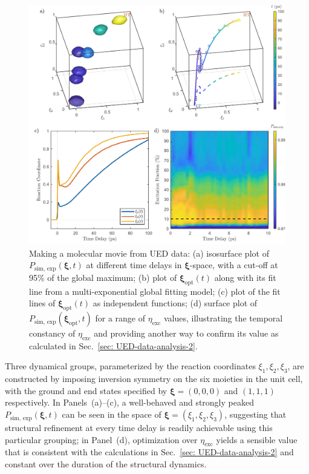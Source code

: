 \begin{figure}[t!]
  \centering
  \includegraphics[width = \textwidth]{Figures/fig_UED_molecularmovie_.pdf}
  \caption[Making a molecular movie from UED data.]{
    Making a molecular movie from UED data:
    (a) isosurface plot of $P_\text{sim, exp}(\boldsymbol{\xi}, t)$ at different time delays
    in $\boldsymbol{\xi}$-space, with a cut-off at 95\% of the global maximum;
    (b) plot of $\boldsymbol{\xi}_\text{opt}(t)$ along with its fit line
    from a multi-exponential global fitting model;
    (c) plot of the fit lines of $\boldsymbol{\xi}_\text{opt}(t)$ as independent functions;
    (d) surface plot of $P_\text{sim, exp}(\boldsymbol{\xi}_\text{opt}, t)$ for a range of $\eta_\text{exc}$
    values, illustrating the temporal constancy of $\eta_\text{exc}$ and providing another way to confirm
    its value as calculated in Sec.~\ref{sec: UED-data-analysis-2}.
  }
  \label{fig: UED-molecularmovie}
\end{figure}

Three dynamical groups, parameterized by the reaction coordinates $\xi_1, \xi_2, \xi_3$, are constructed
by imposing inversion symmetry on the six moieties in the unit cell,
with the ground and end states specified by $\boldsymbol{\xi}  = (0, 0, 0)$ and $(1, 1, 1)$ respectively.
%
In Panels~(a)--(c), a well-behaved and strongly peaked $P_\text{sim, exp}(\boldsymbol{\xi}, t)$
can be seen in the space of $\boldsymbol{\xi} = (\xi_1, \xi_2, \xi_3)$,
suggesting that structural refinement at every time delay is readily achievable using this particular grouping;
in Panel~(d), optimization over $\eta_\text{exc}$ yields a sensible value that is consistent with
the calculations in Sec.~\ref{sec: UED-data-analysis-2} and
constant over the duration of the structural dynamics.
